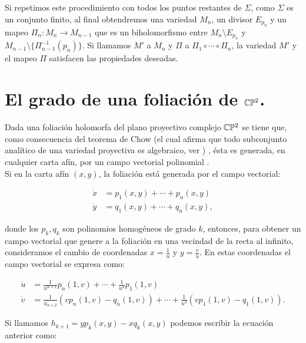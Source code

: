 Si repetimos este procedimiento con todos los puntos restantes de $\Sigma$, como $\Sigma$ es un conjunto finito, al final obtendremos una variedad $M_{n}$, un divisor $E_{p_{n}}$ y un mapeo $\Pi_{n}\colon M_{n}\rightarrow M_{n-1}$ que es un biholomorfismo entre $M_{n}\setminus E_{p_{n}}$ y $M_{n-1}\setminus \{\Pi^{-1}_{n-1}(p_{n})\}$. Si llamamos $M'$ a $M_{n}$ y $\Pi$ a $\Pi_{1}\circ\cdots\circ\Pi_{n}$, la variedad $M'$ y el mapeo $\Pi$ satisfacen las propiedades deseadas.   
 
\section{El grado de una foliación de $\mathbb{C}\mathbb{P}^{2}$.}

Dada una foliación holomorfa del plano proyectivo complejo $\mathbb{C}\mathbb{P}^2$ se tiene que, como consecuencia del teorema de Chow (el cual afirma que todo subconjunto analítico de una variedad proyectiva es algebraico, ver \cite{Mumford}) , ésta es generada, en cualquier carta afín, por un campo vectorial polinomial \cite[p.~477]{IlyaYako}.\\

Si en la carta afín $(x,y)$, la foliación está generada por el campo vectorial:

\begin{equation}
\label{EcuacionEnCP2}
\begin{aligned}
\dot{x} &=p_{1}(x,y)+\cdots+p_{n}(x,y)\\
\dot{y} &=q_{1}(x,y)+\cdots+q_{n}(x,y),
\end{aligned}
\end{equation}

\noindent donde los $p_{k},q_{k}$ son polinomios homogéneos de grado $k$, entonces, para obtener un campo vectorial que genere a la foliación en una vecindad de la recta al infinito, consideramos el cambio de coordenadas $x=\tfrac{1}{u}$ y $y=\tfrac{v}{u}$. En estas coordenadas el campo vectorial se expresa como:

\begin{equation}
\begin{aligned}
\dot{u} &=\frac{1}{u^{n+1}}p_{n}(1,v)+\cdots+\frac{1}{u^{2}}p_{1}(1,v)\\
\dot{v} &=\frac{1}{u_{n+2}}(vp_{n}(1,v)-q_{n}(1,v))+\cdots+\frac{1}{u^{3}}(vp_{1}(1,v)-q_{1}(1,v)).
\end{aligned}
\end{equation}

Si llamamos $h_{k+1}=yp_{k}(x,y)-xq_{k}(x,y)$ podemos escribir la ecuación anterior como:

